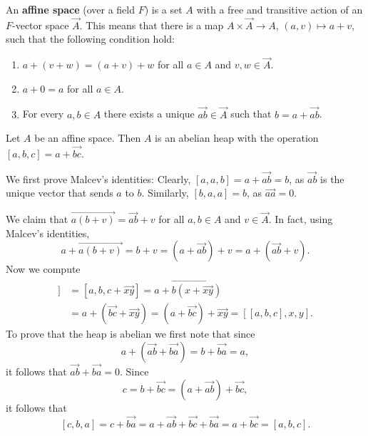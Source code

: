 \documentclass{svmult}
\begin{document}
An \textbf{affine space} (over a field $F$) 
is a set $A$ with a free and transitive action of an $F$-vector space $\overrightarrow{A}$. This means
that there is a map $A\times\overrightarrow{A}\to A$, $(a,v)\mapsto a+v$, such that 
the following condition hold:
\begin{enumerate}
    \item $a+(v+w)=(a+v)+w$ for all $a\in A$ and $v,w\in\overrightarrow{A}$.
    \item $a+0=a$ for all $a\in A$.
    \item For every $a,b\in A$ there exists a unique $\overrightarrow{ab}\in\overrightarrow{A}$ such that
    $b=a+\overrightarrow{ab}$.
\end{enumerate}

\begin{example}
\label{exa:affine}
    Let $A$ be an affine space. Then $A$ is an abelian 
    heap with the operation $[a,b,c]=a+\overrightarrow{bc}$. 
    
    We first prove Malcev's identities:
    Clearly, $[a,a,b]=a+\overrightarrow{ab}=b$, as $\overrightarrow{ab}$ is the unique
    vector that sends $a$ to $b$. Similarly, $[b,a,a]=b$, as $\overrightarrow{aa}=0$. 
    
    We claim that
    $\overrightarrow{a(b+v)}=\overrightarrow{ab}+v$ for all $a,b\in A$ and $v\in\overrightarrow{A}$. 
    In fact, using Malcev's identities, 
    \[
    a+\overrightarrow{a(b+v)}=b+v=\left(a+\overrightarrow{ab}\right)+v=a+\left(\overrightarrow{ab}+v\right).
    \]
    Now we compute
    \begin{align*}
        [a,b,[c,x,y]] &= \left[a,b,c+\overrightarrow{xy}\right]
        =a+\overrightarrow{b\left(x+\overrightarrow{xy}\right)}\\
        &=a+\left(\overrightarrow{bc}+\overrightarrow{xy}\right)
        =\left(a+\overrightarrow{bc}\right)+\overrightarrow{xy}
        =[[a,b,c],x,y].
    \end{align*}
    To prove that the heap is abelian we first note that since 
    \[
    a+\left(\overrightarrow{ab}+\overrightarrow{ba}\right)=b+\overrightarrow{ba}=a,
    \]
    it follows that $\overrightarrow{ab}+\overrightarrow{ba}=0$. Since
    \[
    c=b+\overrightarrow{bc}=\left(a+\overrightarrow{ab}\right)+\overrightarrow{bc},
    \]
    it follows that 
    \[
    [c,b,a]=c+\overrightarrow{ba}=a+\overrightarrow{ab}+\overrightarrow{bc}+\overrightarrow{ba}
    =a+\overrightarrow{bc}
    =[a,b,c].
    \]
\end{example}
\end{document}
